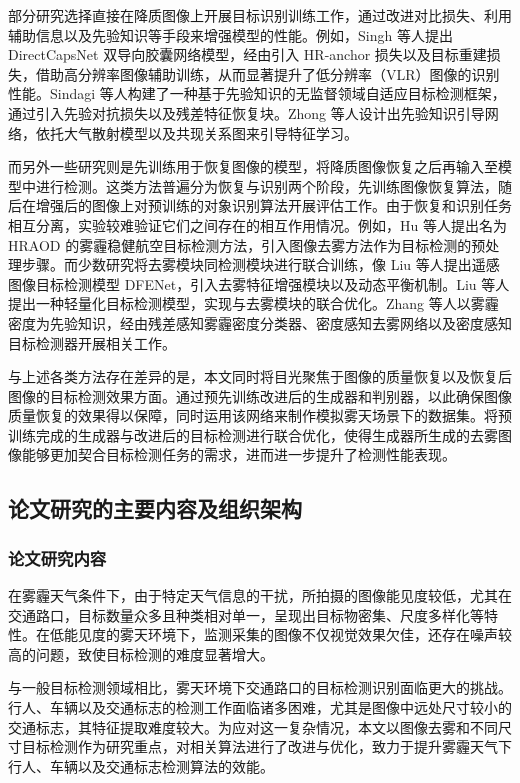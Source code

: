 部分研究选择直接在降质图像上开展目标识别训练工作，通过改进对比损失、利用辅助信息以及先验知识等手段来增强模型的性能。例如，Singh 等人\cite{singh2019dual}提出 DirectCapsNet 双导向胶囊网络模型，经由引入 HR-anchor 损失以及目标重建损失，借助高分辨率图像辅助训练，从而显著提升了低分辨率（VLR）图像的识别性能。Sindagi 等人\cite{sindagi2020prior}构建了一种基于先验知识的无监督领域自适应目标检测框架，通过引入先验对抗损失以及残差特征恢复块。Zhong 等人\cite{zhong2024dehazing}设计出先验知识引导网络，依托大气散射模型以及共现关系图来引导特征学习。

而另外一些研究则是先训练用于恢复图像的模型，将降质图像恢复之后再输入至模型中进行检测。这类方法普遍分为恢复与识别两个阶段，先训练图像恢复算法，随后在增强后的图像上对预训练的对象识别算法开展评估工作。由于恢复和识别任务相互分离，实验较难验证它们之间存在的相互作用情况。例如，Hu 等人\cite{hu2024beyond}提出名为 HRAOD 的雾霾稳健航空目标检测方法，引入图像去雾方法作为目标检测的预处理步骤。而少数研究将去雾模块同检测模块进行联合训练，像 Liu 等人\cite{liu2024oriented}提出遥感图像目标检测模型 DFENet，引入去雾特征增强模块以及动态平衡机制。Liu 等人\cite{liu2024approach}提出一种轻量化目标检测模型，实现与去雾模块的联合优化。Zhang 等人\cite{zhang2020unified}以雾霾密度为先验知识，经由残差感知雾霾密度分类器、密度感知去雾网络以及密度感知目标检测器开展相关工作。

与上述各类方法存在差异的是，本文同时将目光聚焦于图像的质量恢复以及恢复后图像的目标检测效果方面。通过预先训练改进后的生成器和判别器，以此确保图像质量恢复的效果得以保障，同时运用该网络来制作模拟雾天场景下的数据集。将预训练完成的生成器与改进后的目标检测进行联合优化，使得生成器所生成的去雾图像能够更加契合目标检测任务的需求，进而进一步提升了检测性能表现。


\subsection{论文研究的主要内容及组织架构}

\subsubsection{论文研究内容}

在雾霾天气条件下，由于特定天气信息的干扰，所拍摄的图像能见度较低，尤其在交通路口，目标数量众多且种类相对单一，呈现出目标物密集、尺度多样化等特性。在低能见度的雾天环境下，监测采集的图像不仅视觉效果欠佳，还存在噪声较高的问题，致使目标检测的难度显著增大。

与一般目标检测领域相比，雾天环境下交通路口的目标检测识别面临更大的挑战。行人、车辆以及交通标志的检测工作面临诸多困难，尤其是图像中远处尺寸较小的交通标志，其特征提取难度较大。为应对这一复杂情况，本文以图像去雾和不同尺寸目标检测作为研究重点，对相关算法进行了改进与优化，致力于提升雾霾天气下行人、车辆以及交通标志检测算法的效能。

